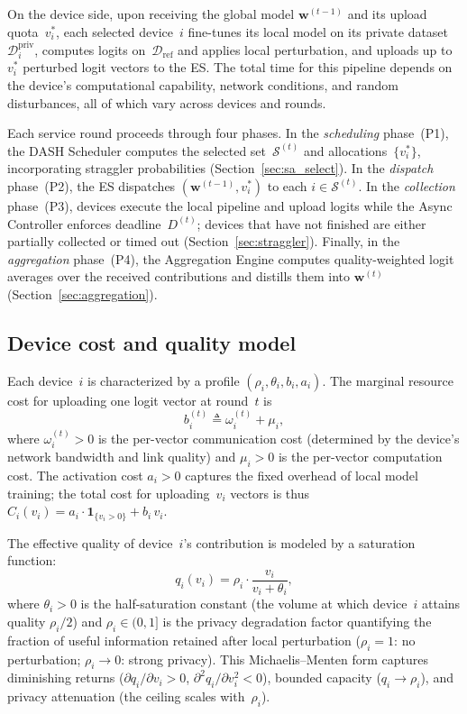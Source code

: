\documentclass[a4paper,fleqn]{cas-dc}
\newcommand{\Dref}{\mathcal{D}_{\mathrm{ref}}}
\newcommand{\Dpriv}{\mathcal{D}_i^{\mathrm{priv}}}
\newcommand{\Sset}{\mathcal{S}}
\begin{document}
	On the device side, upon receiving the global model
	$\mathbf{w}^{(t-1)}$ and its upload quota~$v_i^*$, each selected
	device~$i$ fine-tunes its local model on its private
	dataset~$\Dpriv$, computes logits on~$\Dref$ and applies local
	perturbation, and uploads up to~$v_i^*$ perturbed logit vectors to
	the ES\@.  The total time for this pipeline depends on the device's
	computational capability, network conditions, and random disturbances,
	all of which vary across devices and rounds.
	
	Each service round proceeds through four phases.  In the
	\emph{scheduling} phase~(P1), the DASH Scheduler computes the
	selected set~$\Sset^{(t)}$ and allocations~$\{v_i^*\}$,
	incorporating straggler probabilities
	(Section~\ref{sec:sa_select}).  In the \emph{dispatch} phase~(P2),
	the ES dispatches $(\mathbf{w}^{(t-1)}, v_i^*)$ to each
	$i \in \Sset^{(t)}$.  In the \emph{collection} phase~(P3), devices
	execute the local pipeline and upload logits while the Async
	Controller enforces deadline~$D^{(t)}$; devices that have not
	finished are either partially collected or timed out
	(Section~\ref{sec:straggler}).  Finally, in the \emph{aggregation}
	phase~(P4), the Aggregation Engine computes quality-weighted logit
	averages over the received contributions and distills them into
	$\mathbf{w}^{(t)}$ (Section~\ref{sec:aggregation}).
	
	\subsection{Device cost and quality model}\label{sec:cost_quality}
	
	Each device~$i$ is characterized by a profile
	$(\rho_i, \theta_i, b_i, a_i)$.  The marginal resource cost for
	uploading one logit vector at round~$t$ is
	\begin{equation}\label{eq:cost}
		b_i^{(t)} \triangleq \omega_i^{(t)} + \mu_i,
	\end{equation}
	where $\omega_i^{(t)} > 0$ is the per-vector communication cost
	(determined by the device's network bandwidth and link quality)
	and $\mu_i > 0$ is the per-vector computation cost.  The
	activation cost $a_i > 0$ captures the fixed overhead of local model
	training; the total cost for uploading~$v_i$ vectors is thus
	$C_i(v_i) = a_i \cdot \mathbf{1}_{\{v_i > 0\}} + b_i \, v_i$.
	
	The effective quality of device~$i$'s contribution is modeled by a
	saturation function:
	\begin{equation}\label{eq:quality}
		q_i(v_i) = \rho_i \cdot \frac{v_i}{v_i + \theta_i},
	\end{equation}
	where $\theta_i > 0$ is the half-saturation constant (the volume at
	which device~$i$ attains quality $\rho_i / 2$) and
	$\rho_i \in (0, 1]$ is the privacy degradation factor quantifying
	the fraction of useful information retained after local perturbation
	($\rho_i = 1$: no perturbation; $\rho_i \to 0$: strong privacy).
	This Michaelis--Menten form captures diminishing returns
	($\partial q_i / \partial v_i > 0$,
	$\partial^2 q_i / \partial v_i^2 < 0$), bounded capacity
	($q_i \to \rho_i$), and privacy attenuation (the ceiling scales
	with~$\rho_i$).
	
\end{document}

